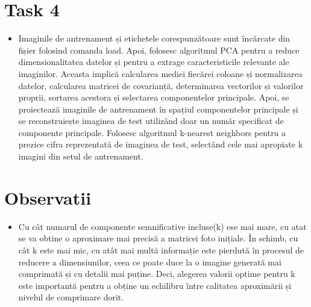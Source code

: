\documentclass{article}
\begin{document}
\section{Task 4}
\begin{itemize}
    \item Imaginile de antrenament și etichetele corespunzătoare 
    sunt încărcate din fișier folosind comanda load. 
    Apoi, folosesc algoritmul PCA pentru a reduce 
    dimensionalitatea datelor și pentru a extrage 
    caracteristicile relevante ale imaginilor. Aceasta 
    implică calcularea mediei fiecărei coloane și 
    normalizarea datelor, calcularea matricei de 
    covarianță, determinarea vectorilor și valorilor 
    proprii, sortarea acestora și selectarea componentelor 
    principale. Apoi, se proiectează imaginile de 
    antrenament în spațiul componentelor principale și se 
    reconstruiește imaginea de test utilizând doar un număr
    specificat de componente principale. Folosesc algoritmul
    k-nearest neighbors pentru a prezice cifra reprezentată 
    de imaginea de test, selectând cele mai apropiate k 
    imagini din setul de antrenament.
\end{itemize}

\section{Observatii}
\begin{itemize}
    \item Cu cât numarul de componente semnificative 
    incluse(k) ese mai mare, cu atat se va obtine o 
    aproximare mai precisă a matricei foto inițiale. 
    În schimb, cu cât k este mai mic, cu atât mai multă 
    informație este pierdută în procesul de reducere a 
    dimensiunilor, ceea ce poate duce la o imagine 
    generată mai comprimată și cu detalii mai puține. 
    Deci, alegerea valorii optime pentru k este importantă
    pentru a obține un echilibru între calitatea 
    aproximării și nivelul de comprimare dorit.
\end{itemize}
\end{document}
